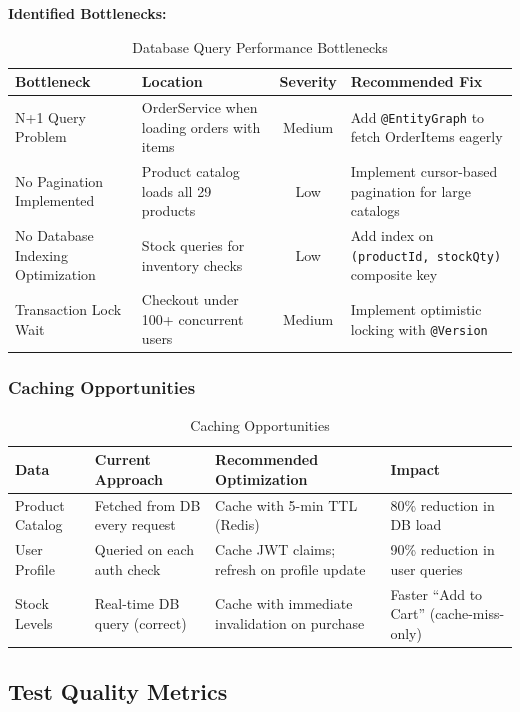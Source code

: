 \documentclass[11pt,a4paper]{article}
\begin{document}
\textbf{Identified Bottlenecks:}

\begin{table}[H]
\centering
\small
\begin{tabularx}{\textwidth}{|p{4cm}|X|c|X|}
\hline
\textbf{Bottleneck} & \textbf{Location} & \textbf{Severity} & \textbf{Recommended Fix} \\
\hline
N+1 Query Problem & OrderService when loading orders with items & Medium & Add \texttt{@EntityGraph} to fetch OrderItems eagerly \\
\hline
No Pagination Implemented & Product catalog loads all 29 products & Low & Implement cursor-based pagination for large catalogs \\
\hline
No Database Indexing Optimization & Stock queries for inventory checks & Low & Add index on \texttt{(productId, stockQty)} composite key \\
\hline
Transaction Lock Wait & Checkout under 100+ concurrent users & Medium & Implement optimistic locking with \texttt{@Version} \\
\hline
\end{tabularx}
\caption{Database Query Performance Bottlenecks}
\end{table}

\subsubsection{Caching Opportunities}

\begin{table}[H]
\centering
\small
\begin{tabularx}{\textwidth}{|l|X|X|X|}
\hline
\textbf{Data} & \textbf{Current Approach} & \textbf{Recommended Optimization} & \textbf{Impact} \\
\hline
Product Catalog & Fetched from DB every request & Cache with 5-min TTL (Redis) & 80\% reduction in DB load \\
\hline
User Profile & Queried on each auth check & Cache JWT claims; refresh on profile update & 90\% reduction in user queries \\
\hline
Stock Levels & Real-time DB query (correct) & Cache with immediate invalidation on purchase & Faster ``Add to Cart'' (cache-miss-only) \\
\hline
\end{tabularx}
\caption{Caching Opportunities}
\end{table}

\subsection{Test Quality Metrics}
\end{document}
